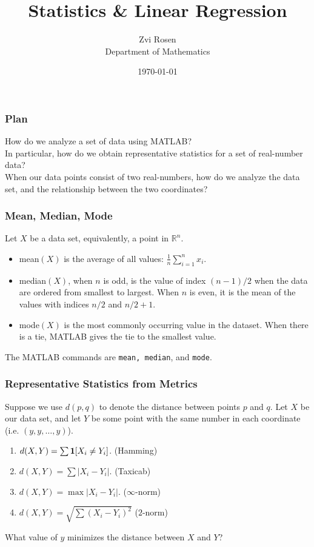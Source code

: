 \documentclass[12pt]{beamer}
\newcommand{\RR}{\ensuremath{\mathbb{R}}}
\theoremstyle{definition}
\begin{document}
\author[Z. Rosen]{Zvi Rosen \\ Department of Mathematics}

\date[\today]{\today}
\title[Statistics \& Linear Regression]{{\Large Statistics \&
 Linear Regression}}


\frame{\titlepage}

\begin{frame}
\frametitle{Plan}
How do we analyze a set of data using MATLAB? \\[3mm]
In particular, how do we obtain representative statistics
for a set of real-number data? \\[3mm]
When our data points consist of two real-numbers, how
do we analyze the data set, and the relationship between
the two coordinates? \\[3mm]


\end{frame}


\begin{frame}
\frametitle{Mean, Median, Mode}
Let $X$ be a data set, equivalently, a point in $\RR^n$. \begin{itemize}

\item mean$(X)$ is the average of all values: $\frac{1}{n}\sum_{i = 1}^n x_i$.

\item median$(X)$, when $n$ is odd, is the value of index $(n-1)/2$ when
the data are ordered from smallest to largest. When $n$ is even,
it is the mean of the values with indices $n/2$ and $n/2 + 1$.

\item mode$(X)$ is the most commonly occurring value in the dataset. When
there is a tie, MATLAB gives the tie to the smallest value.
\end{itemize}

The MATLAB commands are {\tt mean, median}, and {\tt mode}.
\end{frame}

\begin{frame}
\frametitle{Representative Statistics from Metrics}
Suppose we use $d(p,q)$ to denote the distance between
points $p$ and $q$. Let $X$ be our data set, and let $Y$ be some
point with the same number in each coordinate 
(i.e. $(y,y,\ldots,y)$).

\begin{enumerate}
\item $d(X,Y) = \sum {\bf 1}[X_i \neq Y_i]$. (Hamming)
\item $d(X,Y) = \sum |X_i - Y_i|$. (Taxicab)
\item $d(X,Y) = \max |X_i - Y_i|$. ($\infty$-norm)
\item $d(X,Y) = \sqrt{\sum (X_i - Y_i)^2}$ ($2$-norm) 
\end{enumerate}
What value of $y$ minimizes the distance between
$X$ and $Y$?
\end{frame}
\end{document}
